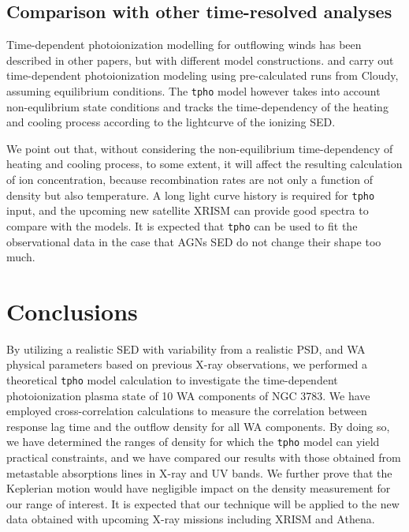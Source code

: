 \documentclass{aa}
\begin{document}
\subsection{Comparison with other time-resolved analyses}

Time-dependent photoionization modelling for outflowing winds has been described in other papers, but with different model constructions.
\cite{Silva2016A&A} and \cite{Juranova2022MNRAS} carry out time-dependent photoionization modeling using pre-calculated runs from Cloudy, assuming equilibrium conditions.
The \texttt{tpho} model \cite{Rogantini2022ApJ} however takes into account non-equlibrium state conditions and tracks the time-dependency of the heating and cooling process according to the lightcurve of the ionizing SED.





We point out that, without considering the non-equilibrium time-dependency of heating and cooling process, to some extent, it will affect the resulting calculation of ion concentration, because recombination rates are not only a function of density but also temperature.
A long light curve history is required for \texttt{tpho} input, and the upcoming new satellite XRISM can provide good spectra to compare with the models. 
It is expected that \texttt{tpho} can be used to fit the observational data in the case that AGNs SED do not change their shape too much.


\section{Conclusions}\label{sect:5}

By utilizing a realistic SED with variability from a realistic PSD, and WA physical parameters based on previous X-ray observations, we performed a theoretical \texttt{tpho} model calculation to investigate the time-dependent photoionization plasma state of 10 WA components of NGC 3783. 
We have employed cross-correlation calculations to measure the correlation between response lag time and the outflow density for all WA components.
By doing so, we have determined the ranges of density for which the \texttt{tpho} model can yield practical constraints, and we have compared our results with those obtained from metastable absorptions lines in X-ray and UV bands.
We further prove that the Keplerian motion would have negligible impact on the density measurement for our range of interest.
It is expected that our technique will be applied to the new data obtained with upcoming X-ray missions including XRISM and Athena.
\end{document}

